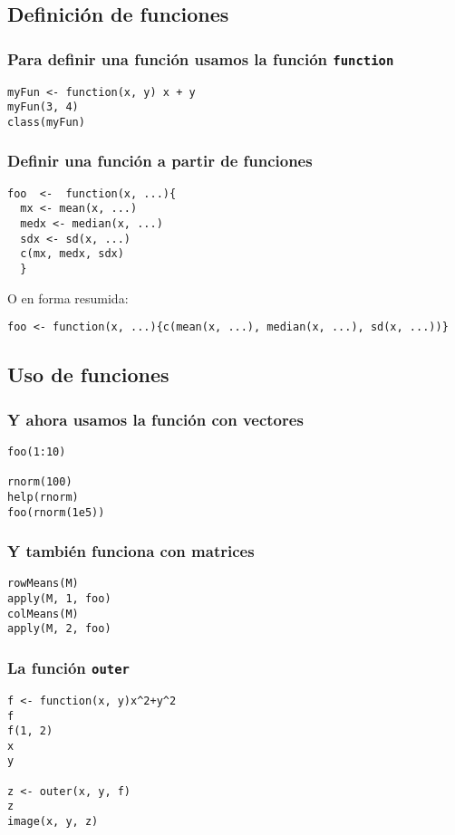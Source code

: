 \documentclass[xcolor={usenames,svgnames,dvipsnames}]{beamer}
\begin{document}
\subsection{Definición de funciones}
\label{sec-3-1}
\begin{frame}[fragile]
\frametitle{Para definir una función usamos la función \texttt{function}}
\label{sec-3-1-1}


\lstset{language=R}
\begin{lstlisting}
myFun <- function(x, y) x + y
myFun(3, 4)
class(myFun)
\end{lstlisting}
\end{frame}
\begin{frame}[fragile]
\frametitle{Definir una función a partir de funciones}
\label{sec-3-1-2}


\lstset{language=R}
\begin{lstlisting}
foo  <-  function(x, ...){
  mx <- mean(x, ...)
  medx <- median(x, ...)
  sdx <- sd(x, ...)
  c(mx, medx, sdx)
  }
\end{lstlisting}
O en forma resumida:

\lstset{language=R}
\begin{lstlisting}
foo <- function(x, ...){c(mean(x, ...), median(x, ...), sd(x, ...))}
\end{lstlisting}
\end{frame}
\subsection{Uso de funciones}
\label{sec-3-2}
\begin{frame}[fragile]
\frametitle{Y ahora usamos la función con vectores}
\label{sec-3-2-1}


\lstset{language=R}
\begin{lstlisting}
foo(1:10)

rnorm(100)
help(rnorm)
foo(rnorm(1e5))
\end{lstlisting}
\end{frame}
\begin{frame}[fragile]
\frametitle{Y también funciona con matrices}
\label{sec-3-2-2}


\lstset{language=R}
\begin{lstlisting}
rowMeans(M)
apply(M, 1, foo)
colMeans(M)
apply(M, 2, foo)
\end{lstlisting}
\end{frame}
\begin{frame}[fragile]
\frametitle{La función \texttt{outer}}
\label{sec-3-2-3}


\lstset{language=R}
\begin{lstlisting}
f <- function(x, y)x^2+y^2
f
f(1, 2)
x
y

z <- outer(x, y, f)
z
image(x, y, z)
\end{lstlisting}
\end{frame}
\end{document}
